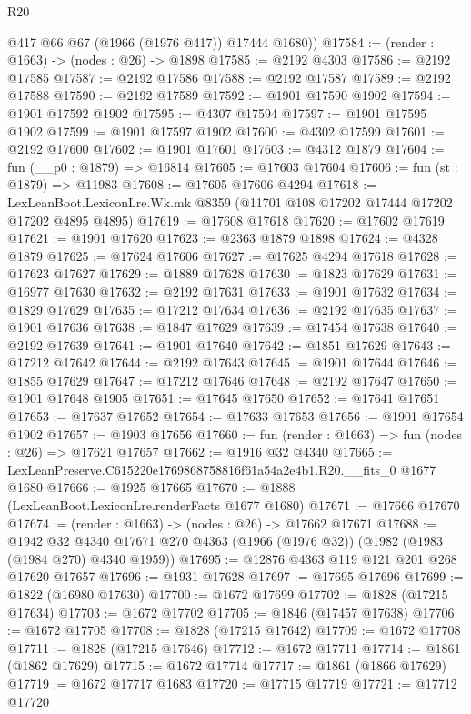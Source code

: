 \begin{lexlean}{R20}
\begin{coremodule}
        @417
        @66
        @67
        (@1966 (@1976 @417))
        @17444
        @1680))
@17584 := (render : @1663) -> (nodes : @26) -> @1898
@17585 := @2192 @4303
@17586 := @2192 @17585
@17587 := @2192 @17586
@17588 := @2192 @17587
@17589 := @2192 @17588
@17590 := @2192 @17589
@17592 := @1901 @17590 @1902
@17594 := @1901 @17592 @1902
@17595 := @4307 @17594
@17597 := @1901 @17595 @1902
@17599 := @1901 @17597 @1902
@17600 := @4302 @17599
@17601 := @2192 @17600
@17602 := @1901 @17601
@17603 := @4312 @1879
@17604 := fun (__p0 : @1879) => @16814
@17605 := @17603 @17604
@17606 := fun (st : @1879) => @11983
@17608 := @17605 @17606 @4294
@17618 := LexLeanBoot.LexiconLre.Wk.mk @8359 (@11701 @108 @17202 @17444 @17202 @17202 @4895 @4895)
@17619 := @17608 @17618
@17620 := @17602 @17619
@17621 := @1901 @17620
@17623 := @2363 @1879 @1898
@17624 := @4328 @1879
@17625 := @17624 @17606
@17627 := @17625 @4294 @17618
@17628 := @17623 @17627
@17629 := @1889 @17628
@17630 := @1823 @17629
@17631 := @16977 @17630
@17632 := @2192 @17631
@17633 := @1901 @17632
@17634 := @1829 @17629
@17635 := @17212 @17634
@17636 := @2192 @17635
@17637 := @1901 @17636
@17638 := @1847 @17629
@17639 := @17454 @17638
@17640 := @2192 @17639
@17641 := @1901 @17640
@17642 := @1851 @17629
@17643 := @17212 @17642
@17644 := @2192 @17643
@17645 := @1901 @17644
@17646 := @1855 @17629
@17647 := @17212 @17646
@17648 := @2192 @17647
@17650 := @1901 @17648 @1905
@17651 := @17645 @17650
@17652 := @17641 @17651
@17653 := @17637 @17652
@17654 := @17633 @17653
@17656 := @1901 @17654 @1902
@17657 := @1903 @17656
@17660 := fun (render : @1663) => fun (nodes : @26) => @17621 @17657
@17662 := @1916 @32 @4340
@17665 := LexLeanPreserve.C615220e1769868758816f61a54a2e4b1.R20.__fits_0 @1677 @1680
@17666 := @1925 @17665
@17670 := @1888 (LexLeanBoot.LexiconLre.renderFacts @1677 @1680)
@17671 := @17666 @17670
@17674 := (render : @1663) -> (nodes : @26) -> @17662 @17671
@17688 := @1942
    @32
    @4340
    @17671
    @270
    @4363
    (@1966 (@1976 @32))
    (@1982 (@1983 (@1984 @270) @4340 @1959))
@17695 := @12876 @4363 @119 @121 @201 @268 @17620 @17657
@17696 := @1931 @17628
@17697 := @17695 @17696
@17699 := @1822 (@16980 @17630)
@17700 := @1672 @17699
@17702 := @1828 (@17215 @17634)
@17703 := @1672 @17702
@17705 := @1846 (@17457 @17638)
@17706 := @1672 @17705
@17708 := @1828 (@17215 @17642)
@17709 := @1672 @17708
@17711 := @1828 (@17215 @17646)
@17712 := @1672 @17711
@17714 := @1861 (@1862 @17629)
@17715 := @1672 @17714
@17717 := @1861 (@1866 @17629)
@17719 := @1672 @17717 @1683
@17720 := @17715 @17719
@17721 := @17712 @17720

\end{coremodule}
\end{lexlean}
